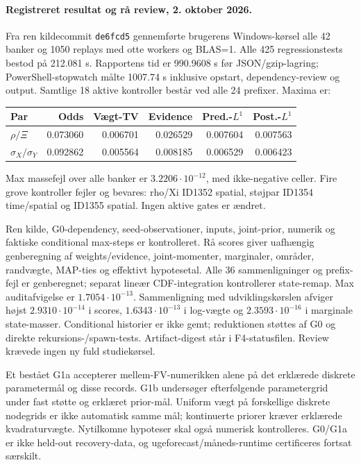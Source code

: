 \paragraph{Registreret resultat og rå review, 2. oktober 2026.}
Fra ren kildecommit \texttt{de6fcd5} gennemførte brugerens Windows-kørsel alle
42 banker og 1050 replays med otte workers og BLAS=1. Alle 425 regressionstests
bestod på 212.081 s. Rapportens tid er 990.9608 s før JSON/gzip-lagring;
PowerShell-stopwatch målte 1007.74 s inklusive opstart, dependency-review og output.
Samtlige 18 aktive kontroller består ved alle 24 prefixer. Maxima er:
\begin{center}
\begin{tabular}{lrrrrr}
\toprule
Par & Odds & Vægt-TV & Evidence & Pred.-\(L^1\) & Post.-\(L^1\)\\
\midrule
\(\rho/\Xi\) & 0.073060 & 0.006701 & 0.026529 & 0.007604 & 0.007563\\
\(\sigma_X/\sigma_Y\) & 0.092862 & 0.005564 & 0.008185 & 0.006529 & 0.006423\\
\bottomrule
\end{tabular}
\end{center}
Max massefejl over alle banker er \(3.2206\cdot10^{-12}\), med ikke-negative
celler. Fire grove kontroller fejler og bevares: rho/Xi ID1352 spatial,
støjpar ID1354 time/spatial og ID1355 spatial. Ingen aktive gates er ændret.

Ren kilde, G0-dependency, seed-observationer, inputs, joint-prior, numerik og
faktiske conditional max-steps er kontrolleret. Rå scores giver uafhængig
genberegning af weights/evidence, joint-momenter, marginaler, områder, randvægte,
MAP-ties og effektivt hypotesetal. Alle 36 sammenligninger og prefix-fejl er
genberegnet; separat lineær CDF-integration kontrollerer state-remap.
Max auditafvigelse er \(1.7054\cdot10^{-13}\). Sammenligning med udviklingskørslen
afviger højst \(2.9310\cdot10^{-14}\) i scores, \(1.6343\cdot10^{-13}\) i log-vægte
og \(2.3593\cdot10^{-16}\) i marginale state-masser. Conditional historier er ikke
gemt; reduktionen støttes af G0 og direkte rekursions-/spawn-tests.
Artifact-digest står i F4-statusfilen. Review krævede ingen ny fuld studiekørsel.

Et bestået G1a accepterer mellem-FV-numerikken alene på det erklærede diskrete
parametermål og disse records. G1b undersøger efterfølgende parametergrid under
fast støtte og erklæret prior-mål. Uniform vægt på forskellige diskrete nodegrids
er ikke automatisk samme mål; kontinuerte priorer kræver erklærede kvadraturvægte.
Nytilkomne hypoteser skal også numerisk kontrolleres. G0/G1a er ikke held-out
recovery-data, og ugeforecast/måneds-runtime certificeres fortsat særskilt.

